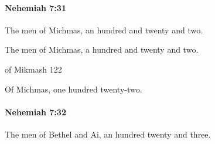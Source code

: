 		\paragraph{Nehemiah 7:31} %
			\label{NEHEMIAH-7-31}

			The men of Michmas, an hundred and twenty and two.

			\begin{versebox}
					\item[BHS] 
					\item[LXX] 
					\item[ASV] The men of Michmas, a hundred and twenty and two.
					\item[NIV] of Mikmash 122
					\item[NRSV] Of Michmas, one hundred twenty-two.
			\end{versebox}

		\paragraph{Nehemiah 7:32} %
			\label{NEHEMIAH-7-32}

			The men of Bethel and Ai, an hundred twenty and three.


